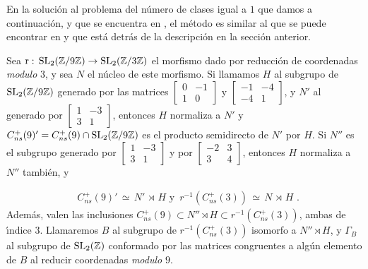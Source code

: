 En la soluci\'{o}n al problema del n\'{u}mero de clases igual a $1$ que damos
a continuaci\'{o}n, y que se encuentra en \cite{baranLevelNine},
el m\'{e}todo es similar al que se puede encontrar en \cite{chenLevelFive}
y que est\'{a} detr\'{a}s de la descripci\'{o}n en la secci\'{o}n anterior.

Sea $\mathrm{r}:\,\mathrm{SL}_{2}(\mathbb{Z}/9\mathbb{Z})\rightarrow\mathrm{SL}_{2}(\mathbb{Z}/3\mathbb{Z})$ el  morfismo
dado por reducci\'{o}n de coordenadas \textit{modulo} $3$, y sea $N$ el
n\'{u}cleo de este morfismo. Si llamamos $H$ al subgrupo de
$\mathrm{SL}_{2}(\mathbb{Z}/9\mathbb{Z})$ generado por las matrices
\begin{math}\left[\begin{smallmatrix}0&-1\\1&0\end{smallmatrix}\right]\end{math}
y
\begin{math}\left[\begin{smallmatrix}-1&-4\\-4&1\end{smallmatrix}\right]\end{math},
y $N'$ al generado por
\begin{math}\left[\begin{smallmatrix}1&-3\\3&1\end{smallmatrix}\right]\end{math},
entonces $H$ normaliza a $N'$
y $C_{ns}^{+}(9)'=C_{ns}^{+}(9)\cap\mathrm{SL}_{2}(\mathbb{Z}/9\mathbb{Z})$ es el producto
semidirecto de $N'$ por $H$.
Si $N''$ es el subgrupo generado por
\begin{math}\left[\begin{smallmatrix}1&-3\\3&1\end{smallmatrix}\right]\end{math}
y por
\begin{math}\left[\begin{smallmatrix}-2&3\\3&4\end{smallmatrix}\right]\end{math},
entonces $H$ normaliza a $N''$ tambi\'{e}n, y

\begin{align*}
 & C_{ns}^{+}(9)'\,\simeq\,N'\,\rtimes\,H\text{ y }
 \,r^{-1}(C_{ns}^{+}(3))\,\simeq\,N\,\rtimes\,H\text{ .}
\end{align*}
Adem\'{a}s, valen las inclusiones
$C_{ns}^{+}(9)\subset N''\rtimes H\subset r^{-1}(C_{ns}^{+}(3))$, ambas de
\'{\i}ndice $3$.
Llamaremos $B$ al subgrupo de $r^{-1}(C_{ns}^{+}(3))$ isomorfo a $N''\rtimes H$, y
$\Gamma_{B}$ al subgrupo de $\mathrm{SL}_{2}(\mathbb{Z})$ conformado por las matrices
congruentes a alg\'{u}n elemento de $B$ al reducir coordenadas \textit{modulo} $9$.

